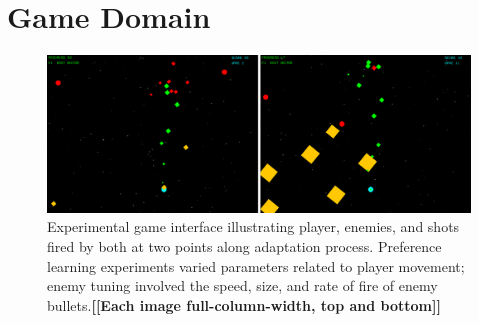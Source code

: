 \documentclass{sig-alternate}
\newcommand{\mytodo}[1]{\textbf{[[#1]]}}
\begin{document}






\section{Game Domain}

\begin{figure}[t]
\centering
\includegraphics[width=1\linewidth]{./bullethell_sidebyside}
\caption{Experimental game interface illustrating player, enemies, and shots fired by both at two points along adaptation process. Preference learning experiments varied parameters related to player movement; enemy tuning involved the speed, size, and rate of fire of enemy bullets.\mytodo{Each image full-column-width, top and bottom}}
\label{fig:shmup}
\end{figure}
\end{document}
